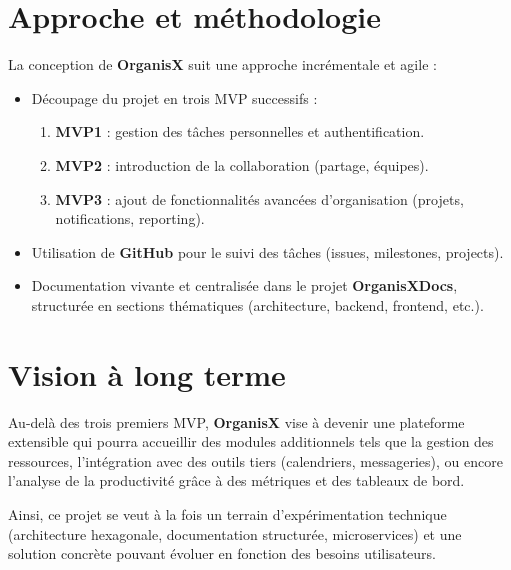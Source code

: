 \section{Approche et méthodologie}
La conception de \textbf{OrganisX} suit une approche incrémentale et agile :
\begin{itemize}
	\item Découpage du projet en trois MVP successifs : 
	\begin{enumerate}
		\item \textbf{MVP1} : gestion des tâches personnelles et authentification.
		\item \textbf{MVP2} : introduction de la collaboration (partage, équipes).
		\item \textbf{MVP3} : ajout de fonctionnalités avancées d’organisation (projets, notifications, reporting).
	\end{enumerate}
	\item Utilisation de \textbf{GitHub} pour le suivi des tâches (issues, milestones, projects).
	\item Documentation vivante et centralisée dans le projet \textbf{OrganisXDocs}, structurée en sections thématiques (architecture, backend, frontend, etc.).
\end{itemize}

\section{Vision à long terme}
Au-delà des trois premiers MVP, \textbf{OrganisX} vise à devenir une plateforme extensible qui pourra accueillir des modules additionnels tels que la gestion des ressources, l’intégration avec des outils tiers (calendriers, messageries), ou encore l’analyse de la productivité grâce à des métriques et des tableaux de bord.

Ainsi, ce projet se veut à la fois un terrain d’expérimentation technique (architecture hexagonale, documentation structurée, microservices) et une solution concrète pouvant évoluer en fonction des besoins utilisateurs.

